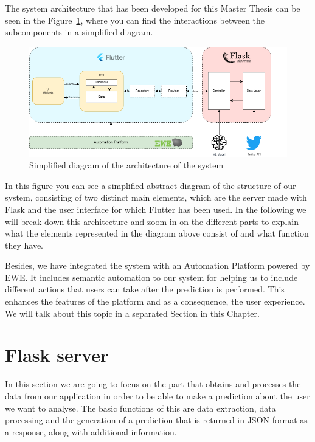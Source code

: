 The system architecture that has been developed for this Master Thesis can be seen in the Figure~\ref{fig:architecture}, where you can find the interactions between the subcomponents in a simplified diagram.

\begin{figure}[h]
    \centering
    \includegraphics[width=1.05\textwidth]{img/architecture/architecture.png}
    \caption{Simplified diagram of the architecture of the system}
    \label{fig:architecture}
\end{figure}


In this figure you can see a simplified abstract diagram of the structure of our system, consisting of two distinct main elements, which are the server made with Flask and the user interface for which Flutter has been used. In the following we will break down this architecture and zoom in on the different parts to explain what the elements represented in the diagram above consist of and what function they have.

Besides, we have integrated the system with an Automation Platform powered by EWE. It includes semantic automation to our system for helping us to include different actions that users can take after the prediction is performed. This enhances the features of the platform and as a consequence, the user experience. We will talk about this topic in a separated Section in this Chapter.

\section{Flask server}
\label{sec:server}
 In this section we are going to focus on the part that obtains and processes the data from our application in order to be able to make a prediction about the user we want to analyse. The basic functions of this are data extraction, data processing and the generation of a prediction that is returned in JSON format as a response, along with additional information.
 

